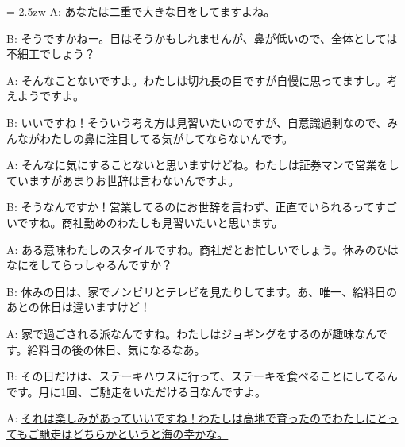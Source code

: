 \documentclass[11pt]{amsart}
\title{}
\author{}
\newenvironment{hangall}[1]{\hangindent = 2.5zw\everypar{\hangindent = 2.5zw}}{}
\begin{document}
\maketitle
\begin{hangall}{}%
A: あなたは二重で大きな目をしてますよね。

B: そうですかねー。目はそうかもしれませんが、鼻が低いので、全体としては不細工でしょう？

A: そんなことないですよ。わたしは切れ長の目ですが自慢に思ってますし。考えようですよ。

B: いいですね！そういう考え方は見習いたいのですが、自意識過剰なので、みんながわたしの鼻に注目してる気がしてならないんです。

A: そんなに気にすることないと思いますけどね。わたしは証券マンで営業をしていますがあまりお世辞は言わないんですよ。

B: そうなんですか！営業してるのにお世辞を言わず、正直でいられるってすごいですね。商社勤めのわたしも見習いたいと思います。

A: ある意味わたしのスタイルですね。商社だとお忙しいでしょう。休みのひはなにをしてらっしゃるんですか？

B: 休みの日は、家でノンビリとテレビを見たりしてます。あ、唯一、給料日のあとの休日は違いますけど！

A: 家で過ごされる派なんですね。わたしはジョギングをするのが趣味なんです。給料日の後の休日、気になるなあ。

B: その日だけは、ステーキハウスに行って、ステーキを食べることにしてるんです。月に1回、ご馳走をいただける日なんですよ。

A: \ul{それは楽しみがあっていいですね！わたしは高地で育ったのでわたしにとってもご馳走はどちらかというと海の幸かな。}\end{hangall}
\end{document}
